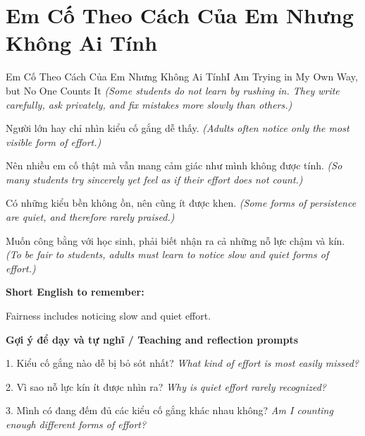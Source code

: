 \section{Em Cố Theo Cách Của Em Nhưng Không Ai Tính}
\begin{truyen}{Em Cố Theo Cách Của Em Nhưng Không Ai Tính}{I Am Trying in My Own Way, but No One Counts It}
\textit{(Some students do not learn by rushing in. They write carefully, ask privately, and fix mistakes more slowly than others.)}

Người lớn hay chỉ nhìn kiểu cố gắng dễ thấy.
\textit{(Adults often notice only the most visible form of effort.)}

Nên nhiều em cố thật mà vẫn mang cảm giác như mình không được tính.
\textit{(So many students try sincerely yet feel as if their effort does not count.)}

Có những kiểu bền không ồn, nên cũng ít được khen.
\textit{(Some forms of persistence are quiet, and therefore rarely praised.)}

\end{truyen}

\begin{baihoc}
Muốn công bằng với học sinh, phải biết nhận ra cả những nỗ lực chậm và kín.
\textit{(To be fair to students, adults must learn to notice slow and quiet forms of effort.)}
\end{baihoc}

\begin{ghinhoanh}
\textbf{Short English to remember:}

Fairness includes noticing slow and quiet effort.

\end{ghinhoanh}

\begin{tuhocnhanh}
\textbf{Gợi ý để dạy và tự nghĩ / Teaching and reflection prompts}

1. Kiểu cố gắng nào dễ bị bỏ sót nhất? \textit{What kind of effort is most easily missed?}

2. Vì sao nỗ lực kín ít được nhìn ra? \textit{Why is quiet effort rarely recognized?}

3. Mình có đang đếm đủ các kiểu cố gắng khác nhau không? \textit{Am I counting enough different forms of effort?}
\end{tuhocnhanh}
\ngancach

